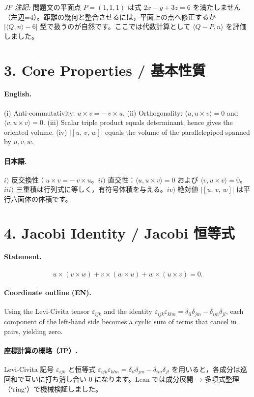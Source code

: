 \documentclass[12pt]{article}
\newcommand{\cross}{\times}
\newcommand{\triple}[3]{\left[ #1,\,#2,\,#3 \right]}
\begin{document}
\noindent\textit{JP 注記:} 問題文の平面点 \(P=(1,1,1)\) は式 \(2x-y+3z=6\) を満たしません（左辺=4）。距離の幾何と整合させるには，平面上の点へ修正するか \(|\langle Q,n\rangle-6|\) 型で扱うのが自然です。ここでは代数計算として \(\langle Q-P,n\rangle\) を評価しました。

\section*{3. Core Properties / 基本性質}
\paragraph{English.}
(i) Anti-commutativity: \(u\cross v = -\,v\cross u\). (ii) Orthogonality: \(\langle u, u\cross v\rangle=0\) and \(\langle v, u\cross v\rangle=0\). (iii) Scalar triple product equals determinant, hence gives the oriented volume. (iv) \(|\triple{u}{v}{w}|\) equals the volume of the parallelepiped spanned by \(u,v,w\).

\paragraph{日本語.}
\(i)\) 反交換性：\(u\cross v = -\,v\cross u\)。\;\(ii)\) 直交性：\(\langle u, u\cross v\rangle=0\) および \(\langle v, u\cross v\rangle=0\)。\;\(iii)\) 三重積は行列式に等しく，有符号体積を与える。\;\(iv)\) 絶対値 \(|\triple{u}{v}{w}|\) は平行六面体の体積です。

\section*{4. Jacobi Identity / Jacobi 恒等式}
\paragraph{Statement.}
\[
u\cross(v\cross w) + v\cross(w\cross u) + w\cross(u\cross v) = 0.
\]
\paragraph{Coordinate outline (EN).}
Using the Levi-Civita tensor \(\varepsilon_{ijk}\) and the identity
\(\varepsilon_{ijk}\varepsilon_{klm} = \delta_{il}\delta_{jm} - \delta_{im}\delta_{jl}\),
each component of the left-hand side becomes a cyclic sum of terms that cancel in pairs, yielding zero.

\paragraph{座標計算の概略（JP）.}
Levi-Civita 記号 \(\varepsilon_{ijk}\) と恒等式 \(\varepsilon_{ijk}\varepsilon_{klm}=\delta_{il}\delta_{jm}-\delta_{im}\delta_{jl}\) を用いると，各成分は巡回和で互いに打ち消し合い 0 になります。Lean では成分展開 → 多項式整理（`ring`）で機械検証しました。
\end{document}
